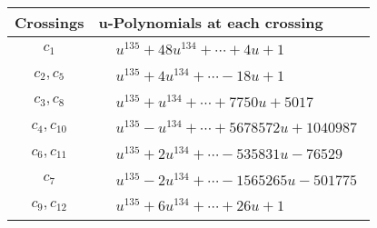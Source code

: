 \documentclass[1p]{elsarticle_modified}
\theoremstyle{definition}
\begin{document}
\begin{tabular}{m{50pt}|m{274pt}}
Crossings & \hspace{64pt}u-Polynomials at each crossing \\
\hline $$\begin{aligned}c_{1}\end{aligned}$$&$\begin{aligned}
&u^{135}+48 u^{134}+\cdots+4 u+1
\end{aligned}$\\
\hline $$\begin{aligned}c_{2},c_{5}\end{aligned}$$&$\begin{aligned}
&u^{135}+4 u^{134}+\cdots-18 u+1
\end{aligned}$\\
\hline $$\begin{aligned}c_{3},c_{8}\end{aligned}$$&$\begin{aligned}
&u^{135}+u^{134}+\cdots+7750 u+5017
\end{aligned}$\\
\hline $$\begin{aligned}c_{4},c_{10}\end{aligned}$$&$\begin{aligned}
&u^{135}- u^{134}+\cdots+5678572 u+1040987
\end{aligned}$\\
\hline $$\begin{aligned}c_{6},c_{11}\end{aligned}$$&$\begin{aligned}
&u^{135}+2 u^{134}+\cdots-535831 u-76529
\end{aligned}$\\
\hline $$\begin{aligned}c_{7}\end{aligned}$$&$\begin{aligned}
&u^{135}-2 u^{134}+\cdots-1565265 u-501775
\end{aligned}$\\
\hline $$\begin{aligned}c_{9},c_{12}\end{aligned}$$&$\begin{aligned}
&u^{135}+6 u^{134}+\cdots+26 u+1
\end{aligned}$\\
\hline
\end{tabular}\\~\\
\end{document}
